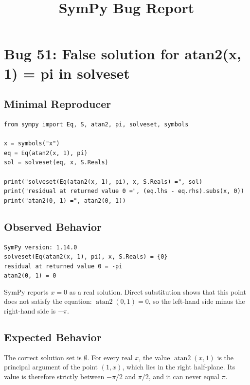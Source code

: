 \documentclass[11pt]{article}
\title{SymPy Bug Report}
\author{}
\date{}
\begin{document}
\maketitle

\section{Bug 51: False solution for atan2(x, 1) = pi in solveset}

\subsection{Minimal Reproducer}

\medskip

\begin{lstlisting}[style=bugpython]
from sympy import Eq, S, atan2, pi, solveset, symbols

x = symbols("x")
eq = Eq(atan2(x, 1), pi)
sol = solveset(eq, x, S.Reals)

print("solveset(Eq(atan2(x, 1), pi), x, S.Reals) =", sol)
print("residual at returned value 0 =", (eq.lhs - eq.rhs).subs(x, 0))
print("atan2(0, 1) =", atan2(0, 1))
\end{lstlisting}

\subsection{Observed Behavior}

\medskip

\begin{lstlisting}[style=bugpython]
SymPy version: 1.14.0
solveset(Eq(atan2(x, 1), pi), x, S.Reals) = {0}
residual at returned value 0 = -pi
atan2(0, 1) = 0
\end{lstlisting}

SymPy reports \(x=0\) as a real solution. Direct substitution shows that this
point does not satisfy the equation: \(\operatorname{atan2}(0,1)=0\), so the
left-hand side minus the right-hand side is \(-\pi\).

\subsection{Expected Behavior}

The correct solution set is \(\emptyset\). For every real \(x\), the value
\(\operatorname{atan2}(x,1)\) is the principal argument of the point
\((1,x)\), which lies in the right half-plane. Its value is therefore strictly
between \(-\pi/2\) and \(\pi/2\), and it can never equal \(\pi\).
\end{document}
